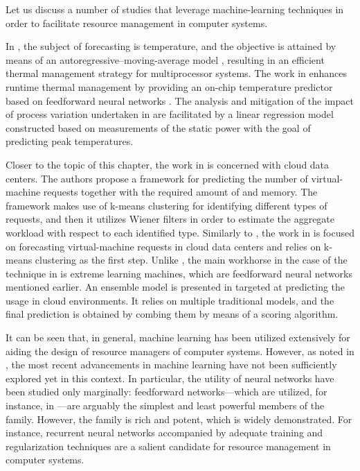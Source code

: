 Let us discuss a number of studies that leverage machine-learning techniques in
order to facilitate resource management in computer systems.

In \cite{coskun2008}, the subject of forecasting is temperature, and the
objective is attained by means of an autoregressive--moving-average model
\cite{hastie2013}, resulting in an efficient thermal management strategy for
multiprocessor systems. The work in \cite{kumar2010} enhances runtime thermal
management by providing an on-chip temperature predictor based on feedforward
neural networks \cite{hastie2013}. The analysis and mitigation of the impact of
process variation undertaken in \cite{juan2014} are facilitated by a linear
regression model \cite{hastie2013} constructed based on measurements of the
static power with the goal of predicting peak temperatures.

Closer to the topic of this chapter, the work in \cite{dabbagh2015} is concerned
with cloud data centers. The authors propose a framework for predicting the
number of virtual-machine requests together with the required amount of 
and memory. The framework makes use of k-means clustering \cite{hastie2013} for
identifying different types of requests, and then it utilizes Wiener filters in
order to estimate the aggregate workload with respect to each identified type.
Similarly to \cite{dabbagh2015}, the work in \cite{ismaeel2015} is focused on
forecasting virtual-machine requests in cloud data centers and relies on k-means
clustering as the first step. Unlike \cite{dabbagh2015}, the main workhorse in
the case of the technique in \cite{ismaeel2015} is extreme learning machines,
which are feedforward neural networks mentioned earlier. An ensemble model
\cite{hastie2013} is presented in \cite{cao2014} targeted at predicting the
 usage in cloud environments. It relies on multiple traditional models,
and the final prediction is obtained by combing them by means of a scoring
algorithm.

It can be seen that, in general, machine learning has been utilized extensively
for aiding the design of resource managers of computer systems. However, as
noted in , the most recent advancements in machine
learning have not been sufficiently explored yet in this context. In particular,
the utility of neural networks have been studied only marginally: feedforward
networks---which are utilized, for instance, in \cite{kumar2010,
ismaeel2015}---are arguably the simplest and least powerful members of the
family. However, the family is rich and potent, which is widely demonstrated.
For instance, recurrent neural networks accompanied by adequate training and
regularization techniques \cite{goodfellow2016} are a salient candidate for
resource management in computer systems.

